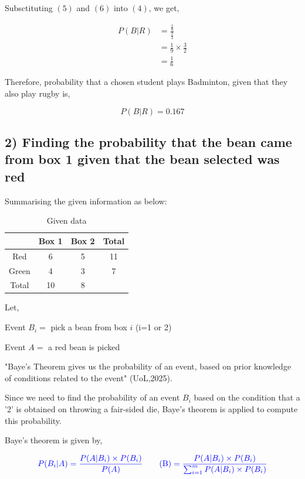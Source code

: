 \documentclass[a4paper]{report}
\begin{document}
Subsctituting $(5)$ and $(6)$ into $(4)$, we get,

\begin{align*}
    P(B|R)&=\frac{\frac{1}{9}}{\frac{2}{3}} \\
    &=\frac{1}{9}\times \frac{3}{2} \\
    &=\frac{1}{6}
\end{align*}


Therefore, probability that a chosen student plays Badminton, given that they also play rugby is,

\begin{equation*}
    \boxed{P(B|R)=0.167}
\end{equation*}

\subsection*{2) Finding the probability that the bean came from box 1 given that the bean selected was red}

Summarising the given information as below:

\begin{table}[h]
    \centering
    \begin{tabular}{|c|c|c|c|}
        \hline
         & Box 1 & Box 2 & Total \\ \hline
        Red & 6 & 5 & 11 \\ \hline
        Green & 4 & 3 & 7 \\ \hline
        Total & 10 & 8 &  \\ \hline
    \end{tabular}
    \caption{Given data}
    \label{tab:placeholder_label}
\end{table}

Let,

Event $B_i=$ pick a bean from box $i$ (i=1 or 2)

Event $A=$ a red bean is picked

"Baye's Theorem gives us the probability of an event, based on prior knowledge of conditions related to the event" (UoL,2025).

Since we need to find the probability of an event $B_i$ based on the condition that a '2' is obtained on throwing a fair-sided die, Baye's theorem is applied to compute this probability.

Baye's theorem is given by,

\begin{equation*}
    \color{blue} P(B_i|A)=\frac{P(A|B_i)\times P(B_i)}{P(A)} \tag{B} \\
    =\frac{P(A|B_i)\times P(B_i)}{\sum_{i=1}^m P(A|B_i)\times P(B_i)}
\end{equation*}
\end{document}
